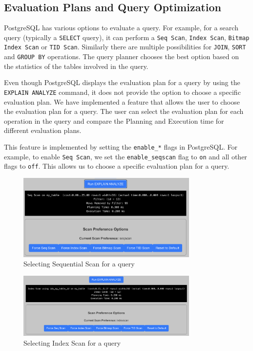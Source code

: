 \documentclass{article}
\begin{document}
\subsection{Evaluation Plans and Query Optimization}

PostgreSQL has various options to evaluate a query. For example, for a search query (typically a \verb|SELECT| query), it can perform a \verb|Seq Scan|, \verb|Index Scan|, \verb|Bitmap Index Scan| or \verb|TID Scan|. Similarly there are multiple possibilities for \verb|JOIN|, \verb|SORT| and \verb|GROUP BY| operations. The query planner chooses the best option based on the statistics of the tables involved in the query.

\medskip

Even though PostgreSQL displays the evaluation plan for a query by using the \verb|EXPLAIN ANALYZE| command, it does not provide the option to choose a specific evaluation plan. We have implemented a feature that allows the user to choose the evaluation plan for a query. The user can select the evaluation plan for each operation in the query and compare the Planning and Execution time for different evaluation plans.

\medskip

This feature is implemented by setting the \verb|enable_*| flags in PostgreSQL. For example, to enable \verb|Seq Scan|, we set the \verb|enable_seqscan| flag to \verb|on| and all other flags to \verb|off|. This allows us to choose a specific evaluation plan for a query.

\begin{figure}[htbp]
    \centering
    \includegraphics[width=0.8\textwidth]{seq.png}
    \caption{Selecting Sequential Scan for a query}
\end{figure}


\begin{figure}[htbp]
    \centering
    \includegraphics[width=0.8\textwidth]{index.png}
    \caption{Selecting Index Scan for a query}
\end{figure}
\end{document}
